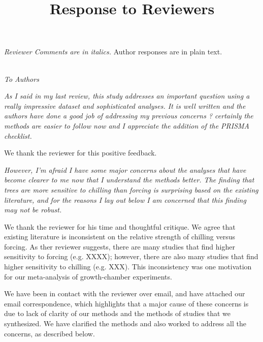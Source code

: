 \documentclass[11pt, a4paper]{article}
\begin{document}
{}


\setlength\parindent{0pt}


\title{Response to Reviewers}
\emph{Reviewer Comments are in italics.} Author responses are in plain text.\\

 \emph{}\\

\par \emph{To Authors}
\par \emph{As I said in my last review, this study addresses an important question using a really impressive
dataset and sophisticated analyses. It is well written and the authors have done a good job of
addressing my previous concerns ? certainly the methods are easier to follow now and I appreciate
the addition of the PRISMA checklist.}\\
\par We thank the reviewer for this positive feedback.
\par \emph{However, I'm afraid I have some major concerns about the analyses that have become clearer to me
now that I understand the methods better. The finding that trees are more sensitive to chilling than
forcing is surprising based on the existing literature, and for the reasons I lay out below I am
concerned that this finding may not be robust.}
\par We thank the reviewer for his time and thoughtful critique. We agree that existing literature is inconsistent on the relative strength of chilling versus forcing. As ther reviewer suggests, there are many studies that find higher sensitivity to forcing (e.g. XXXX); however, there are also many studies that find higher sensitivity to chilling (e.g. XXX). This inconsistency was one motivation for our meta-analysis of growth-chamber experiments. 

\par We have been in contact with the reviewer over email, and have attached our email correspondence, which highlights that a major cause of these concerns is due to lack of clarity of our methods and the methods of studies that we synthesized. We have clarified the methods and also worked to address all the concerns, as described below.
\end{document}
